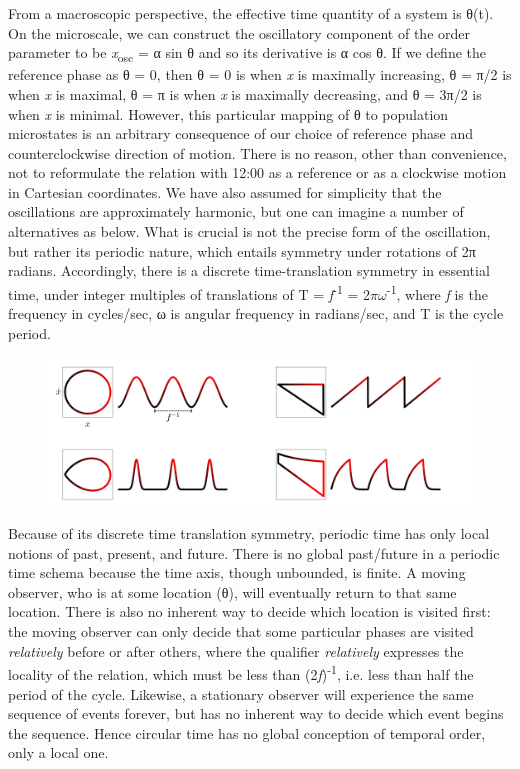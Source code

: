   From a macroscopic perspective, the effective time quantity of a system is θ(t). On the microscale, we can construct the oscillatory component of the order parameter to be \textit{x}\textsubscript{osc} = α sin θ and so its derivative is α cos θ. If we define the reference phase as θ = 0, then θ = 0 is when \textit{x} is maximally increasing, θ = π/2 is when \textit{x} is maximal, θ = π is when \textit{x} is maximally decreasing, and θ = 3π/2 is when \textit{x} is minimal. However, this particular mapping of θ to population microstates is an arbitrary consequence of our choice of reference phase and counterclockwise direction of motion. There is no reason, other than convenience, not to reformulate the relation with 12:00 as a reference or as a clockwise motion in Cartesian coordinates. We have also assumed for simplicity that the oscillations are approximately harmonic, but one can imagine a number of alternatives as below. What is crucial is not the precise form of the oscillation, but rather its periodic nature, which entails symmetry under rotations of 2π radians. Accordingly, there is a discrete time-translation symmetry in essential time, under integer multiples of translations of T = \textit{f}\textsuperscript{{}-1} = 2$\pi \omega $\textsuperscript{{}-1}, where \textit{f} is the frequency in cycles/sec, ω is angular frequency in radians/sec, and T is the cycle period.

  
\begin{figure}
\includegraphics[width=\textwidth]{figures/Tilsen-img47.png}
\caption{\missingcaption}
\label{fig:}
\end{figure}
 

  Because of its discrete time translation symmetry, periodic time has only local notions of past, present, and future. There is no global past/future in a periodic time schema because the time axis, though unbounded, is finite. A moving observer, who is at some location (θ), will eventually return to that same location. There is also no inherent way to decide which location is visited first: the moving observer can only decide that some particular phases are visited \textit{relatively} before or after others, where the qualifier \textit{relatively} expresses the locality of the relation, which must be less than (2\textit{f})\textsuperscript{{}-1}, i.e. less than half the period of the cycle. Likewise, a stationary observer will experience the same sequence of events forever, but has no inherent way to decide which event begins the sequence. Hence circular time has no global conception of temporal order, only a local one. 

